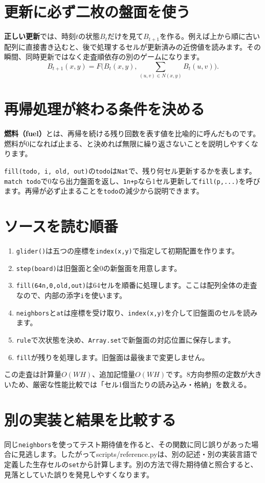 \documentclass[11pt,a4paper,openany]{book}
\newcommand{\code}[1]{\texttt{#1}}
\newcommand{\file}[1]{\textsf{\color{blue}#1}}
\newcommand{\term}[1]{\textbf{#1}}
\newcommand{\readcode}[2]{}
\begin{document}
\section{更新に必ず二枚の盤面を使う}
\term{正しい更新}では、時刻\(t\)の状態\(B_t\)だけを見て\(B_{t+1}\)を作る。例えば上から順に古い配列に直接書き込むと、後で処理するセルが更新済みの近傍値を読みます。その瞬間、同時更新ではなく走査順依存の別のゲームになります。
\[
B_{t+1}(x,y)=F\Big(B_t(x,y),\sum_{(u,v)\in N(x,y)}B_t(u,v)\Big).
\]
\section{再帰処理が終わる条件を決める}
\term{燃料（fuel）}とは、再帰を続ける残り回数を表す値を比喩的に呼んだものです。燃料が0になれば止まる、と決めれば無限に繰り返さないことを説明しやすくなります。

\code{fill(todo, i, old, out)}の\code{todo}は\code{Nat}で、残り何セル更新するかを表します。\code{match todo}で0なら出力盤面を返し、\code{1n+p}なら1セル更新して\code{fill(p,...)}を呼びます。再帰が必ず止まることを\code{todo}の減少から説明できます。

\readcode{07_life_core.bend}{完成した純粋な更新核（07\_life\_core.bend）}

\section{ソースを読む順番}
\begin{enumerate}
\item \code{glider()}は五つの座標を\code{index(x,y)}で指定して初期配置を作ります。
\item \code{step(board)}は旧盤面と全0の新盤面を用意します。
\item \code{fill(64n,0,old,out)}は64セルを順番に処理します。ここは配列全体の走査なので、内部の添字\code{i}を使います。
\item \code{neighbors}と\code{at}は座標を受け取り、\code{index(x,y)}を介して旧盤面のセルを読みます。
\item \code{rule}で次状態を決め、\code{Array.set}で新盤面の対応位置に保存します。
\item \code{fill}が残りを処理します。旧盤面は最後まで変更しません。
\end{enumerate}
この走査は計算量\(O(WH)\)、追加記憶量\(O(WH)\)です。8方向参照の定数が大きいため、厳密な性能比較では「セル1個当たりの読み込み・格納」を数える。

\section{別の実装と結果を比較する}
同じ\code{neighbors}を使ってテスト期待値を作ると、その関数に同じ誤りがあった場合に見逃します。したがって\file{scripts/reference.py}は、別の記述・別の実装言語で定義した生存セルの\code{set}から計算します。別の方法で得た期待値と照合すると、見落としていた誤りを発見しやすくなります。
\end{document}
